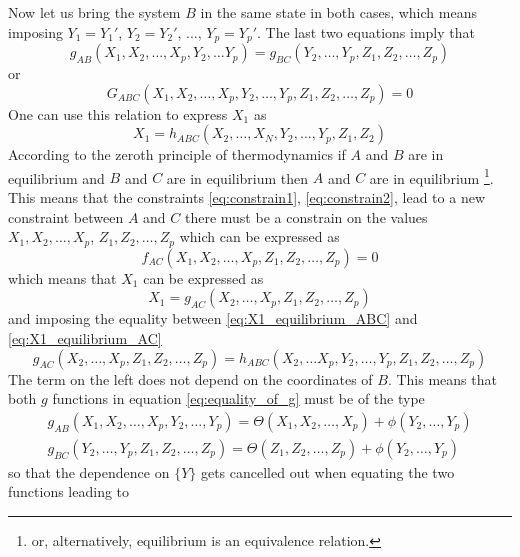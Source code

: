 Now let us bring the system $B$ in the same state in both cases, which means imposing $Y_1 = Y_1'$, $Y_2 = Y_2'$, ..., $Y_p = Y_p'$. The last two equations imply that 
\begin{equation}
    g_{AB} (X_1, X_2, \dots, X_p, Y_2, \dots Y_p) = g_{BC} (Y_2, \dots, Y_p, Z_1, Z_2, \dots, Z_p)
    \label{eq:equality_of_g}
\end{equation}
or
\begin{equation*}
    G_{ABC} (X_1, X_2, \dots, X_p, Y_2, \dots, Y_p, Z_1, Z_2, \dots, Z_p) = 0
\end{equation*}
One can use this relation to express $X_1$ as 
\begin{equation}
    X_1 = h_{ABC}(X_2, \dots, X_N, Y_2, \dots, Y_p, Z_1, Z_2)
    \label{eq:X1_equilibrium_ABC}
\end{equation}
According to the zeroth principle of thermodynamics if $A$ and $B$ are in equilibrium and $B$ and $C$ are in equilibrium then $A$ and $C$ are in equilibrium 
\footnote{or, alternatively, equilibrium is an equivalence relation.}. This means that the constraints \ref{eq:constrain1}, \ref{eq:constrain2}, lead to a new constraint between $A$ and $C$
there must be a constrain on the values ${X_1, X_2, \dots, X_p}$, ${Z_1, Z_2, \dots, Z_p}$ which can be expressed as 
\begin{equation*}
    f_{AC} (X_1, X_2, \dots, X_p, Z_1, Z_2, \dots, Z_p) = 0
\end{equation*}
which means that $X_1$ can be expressed as
\begin{equation}
    X_1 = g_{AC} (X_2, \dots, X_p, Z_1, Z_2, \dots, Z_p)
    \label{eq:X1_equilibrium_AC}
\end{equation}
and imposing the equality between \ref{eq:X1_equilibrium_ABC} and \ref{eq:X1_equilibrium_AC}
\begin{equation*}
    g_{AC} (X_2, \dots, X_p, Z_1, Z_2, \dots, Z_p) = h_{ABC}(X_2, \dots X_p, Y_2, \dots, Y_p, Z_1, Z_2, ..., Z_p)
\end{equation*}
The term on the left does not depend on the coordinates of $B$. This means that both $g$ functions in equation \ref{eq:equality_of_g} must be of the type
\begin{gather*}
    g_{AB}(X_1, X_2, \dots, X_p, Y_2, \dots, Y_p) = \Theta(X_1, X_2, \dots, X_p) + \phi(Y_2, \dots, Y_p) \\
    g_{BC}(Y_2, \dots, Y_p, Z_1, Z_2, \dots, Z_p) = \Theta(Z_1, Z_2, \dots, Z_p) + \phi(Y_2, \dots, Y_p)
\end{gather*}
so that the dependence on $\{Y\}$ gets cancelled out when equating the two functions leading to 
